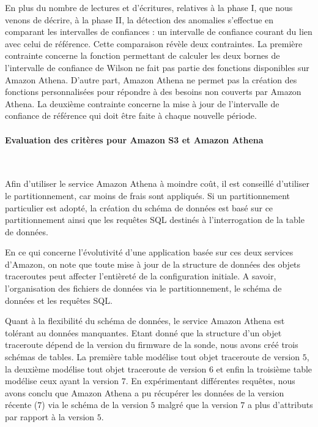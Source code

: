 En plus du nombre de lectures et d'écritures, relatives à la phase I, que nous venons de décrire, à la phase II, la détection des anomalies s'effectue en  comparant les intervalles de confiances : un intervalle de confiance courant du lien avec celui de référence. Cette comparaison révèle deux contraintes. La première contrainte concerne  la fonction permettant de calculer les deux bornes de l'intervalle de confiance de Wilson ne fait pas partie des fonctions disponibles sur Amazon Athena. D'autre part, Amazon Athena ne permet pas la création des fonctions personnalisées pour répondre à des besoins non couverts par Amazon Athena. La deuxième contrainte concerne la mise à jour de l'intervalle de confiance de référence qui doit être faite à chaque nouvelle période.


\paragraph{Evaluation des critères pour Amazon S3 et Amazon Athena  }~

Afin d'utiliser le service Amazon Athena à moindre coût, il est conseillé d'utiliser le partitionnement, car moins de frais sont appliqués. Si un partitionnement particulier est adopté, la création du schéma de données est basé sur ce partitionnement ainsi que les requêtes SQL destinés à l'interrogation de la table de données.

En ce qui concerne l'évolutivité d'une application basée sur ces deux services d'Amazon, on note que toute mise à jour de la structure de données des objets traceroutes peut affecter l'entièreté de la configuration initiale. A savoir, l'organisation des fichiers de données via le partitionnement, le schéma de données et les requêtes SQL.

 Quant à la flexibilité du schéma de données, le service  Amazon Athena est tolérant au données manquantes. Etant donné que la structure d'un objet traceroute dépend de la version du firmware de la sonde, nous avons créé trois schémas de tables. La première table  modélise tout objet traceroute de  version $5$, la deuxième modélise tout objet traceroute de version $6$ et enfin la troisième table modélise ceux ayant la version $7$. En expérimentant différentes requêtes, nous avons conclu  que Amazon Athena a pu récupérer les données de la version récente ($7$) via le schéma de la version $5$ malgré que la version $7$ a plus d'attributs par rapport à la version $5$.
 


